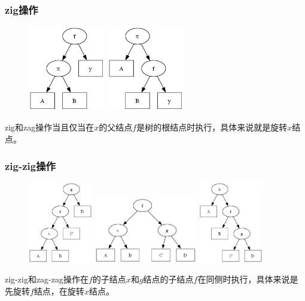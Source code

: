 \documentclass[utf8]{ctexbeamer}
\begin{document}
    \begin{frame}
        \frametitle{zig操作}
        \begin{figure}
            \includegraphics[width=0.3\textwidth]{images/right_rotate0.png}
            \includegraphics[width=0.3\textwidth]{images/right_rotate2.png}
        \end{figure}
        zig和zag操作当且仅当在$x$的父结点$f$是树的根结点时执行，具体来说就是旋转$x$结点。
    \end{frame}

    \begin{frame}
        \frametitle{zig-zig操作}
        \begin{figure}
            \includegraphics[width=0.25\textwidth]{images/splay_zig-zig0.png}
            \includegraphics[width=0.4\textwidth]{images/splay_zig-zig1.png}
            \includegraphics[width=0.25\textwidth]{images/splay_zig-zig2.png}
        \end{figure}
        zig-zig和zag-zag操作在$f$的子结点$x$和$g$结点的子结点$f$在同侧时执行，具体来说是先旋转$f$结点，在旋转$x$结点。
    \end{frame}
\end{document}
